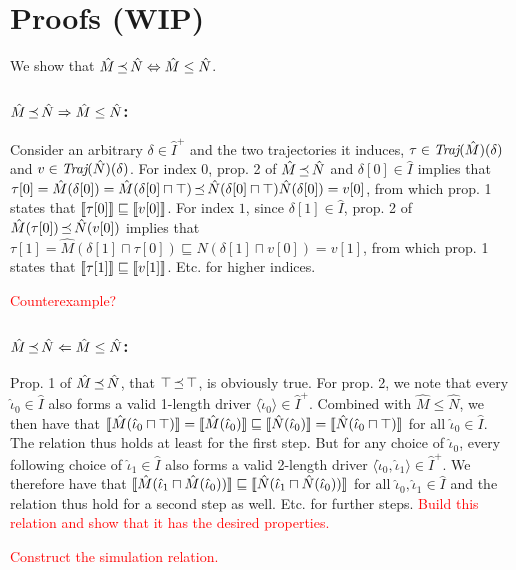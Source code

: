 \section{Proofs (WIP)}

We show that $\hat M \operatorname{\preceq} \hat N \Leftrightarrow \hat M \leq \hat N$.

\subsubsection{$\hat M \operatorname{\preceq} \hat N \Rightarrow \hat M \leq \hat N$:}

Consider an arbitrary $\delta \in \hat I^{+}$ and the two trajectories it induces, $\tau \in \textit{Traj}(\hat M)(\delta)$ and $v \in \textit{Traj}(\hat N)(\delta)$. For index $0$, prop. 2 of $\hat M \operatorname{\preceq} \hat N$ and $\delta[0] \in \hat I$ implies that $\tau[0] = \hat M(\delta[0]) = \hat M(\delta[0] \sqcap \top) \operatorname{\preceq} \hat N(\delta[0] \sqcap \top) \hat N(\delta[0]) = v[0]$, from which prop. 1 states that $\llbracket\tau[0]\rrbracket \sqsubseteq \llbracket v[0]\rrbracket$. For index $1$, since $\delta[1] \in \hat I$, prop. 2 of $\hat M(\tau[0]) \operatorname{\preceq} \hat N(v[0])$ implies that $\tau[1] = \hat M(\delta[1] \sqcap \tau[0]) \sqsubseteq \hat N(\delta[1] \sqcap v[0]) = v[1]$, from which prop. 1 states that $\llbracket\tau[1]\rrbracket \sqsubseteq \llbracket v[1]\rrbracket$. Etc. for higher indices.

\textcolor{red}{Counterexample?}

\subsubsection{$\hat M \operatorname{\preceq} \hat N \Leftarrow \hat M \leq \hat N$:}

Prop. 1 of $\hat M \operatorname{\preceq} \hat N$, that $\top \operatorname{\preceq} \top$, is obviously true. For prop. 2, we note that every $\hat \iota_{0} \in \hat I$ also forms a valid 1-length driver $\langle \hat \iota_{0} \rangle \in \hat I^{+}$. Combined with $\hat M \leq \hat N$, we then have that $\llbracket\hat M(\hat \iota_{0} \sqcap \top)\rrbracket = \llbracket\hat M(\hat \iota_{0})\rrbracket \sqsubseteq \llbracket\hat N(\hat \iota_{0})\rrbracket = \llbracket\hat N(\hat \iota_{0} \sqcap \top)\rrbracket$ for all $\hat \iota_{0} \in \hat I$. The relation thus holds at least for the first step. But for any choice of $\hat \iota_{0}$, every following choice of $\hat \iota_{1} \in \hat I$ also forms a valid 2-length driver $\langle \hat \iota_{0}, \hat \iota_{1} \rangle \in \hat I^{+}$. We therefore have that $\llbracket\hat M(\hat \iota_{1} \sqcap \hat M(\hat \iota_{0}))\rrbracket \sqsubseteq \llbracket\hat N(\hat \iota_{1} \sqcap \hat N(\hat \iota_{0}))\rrbracket$ for all $\hat \iota_{0}, \hat \iota_{1} \in \hat I$ and the relation thus hold for a second step as well. Etc. for further steps. \textcolor{red}{Build this relation and show that it has the desired properties.}

\textcolor{red}{Construct the simulation relation.}
